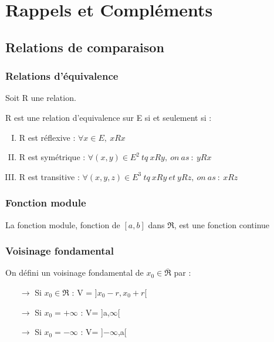 \chapter{Rappels et Compléments}
\section{Relations de comparaison}
\subsection{Relations d'équivalence}
Soit R une relation.
\begin{enon}
R est une relation d'equivalence sur E si et seulement si :
\begin{enumerate}[I) ]
 \item R est réflexive : $\forall x \in E,~ xRx$
 \item R est symétrique : $\forall (x,y) \in E^2~ tq~ xRy,~ on~ as~ :~ yRx$
 \item R est transitive : $\forall (x,y,z) \in E^3~ tq~ xRy~ et~ yRz,~ on~ as~ :~ xRz$
\end{enumerate}
\end{enon}
\subsection{Fonction module}
\begin{enon}
La fonction module, fonction de $\left[a,b\right]$ dans $\Re$, est une fonction continue
\end{enon}
\subsection{Voisinage fondamental}
\begin{de}
On défini un voisinage fondamental de $x_0 \in \bar{\Re}$ par : 
\begin{itemize}
 \item[$\rightarrow$] Si $x_0 \in \Re$ : V = ]$x_0-r,x_0+r$[
 \item[$\rightarrow$] Si $x_0 = + \infty$ : V= ]a,$\infty$[
 \item[$\rightarrow$] Si $x_0 = - \infty$ : V= ]$-\infty$,a[
\end{itemize}
\end{de}
